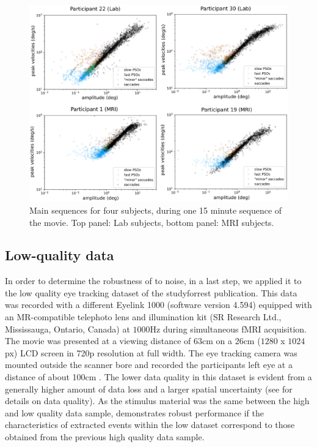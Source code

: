     \begin{figure}[h!]
        \includegraphics[width=1\textwidth]{img/main_sequences.eps}
        \caption{Main sequences for four subjects, during one 15 minute sequence of
        the movie. Top panel: Lab subjects, bottom panel: MRI subjects.}
        \label{fig:mains}
    \end{figure}

    \subsection*{Low-quality data}\label{ana_3}

    In order to determine the robustness of \remodnav to noise, in a last step, we applied it to the low quality eye
    tracking dataset of the studyforrest publication. This data was recorded with a different Eyelink 1000 (software
    version 4.594) equipped with an MR-compatible telephoto lens and illumination kit (SR Research Ltd., Mississauga,
    Ontario, Canada) at $1000$Hz during simultaneous fMRI acquisition. The movie was presented at a viewing distance
    of $63$cm on a 26cm ($1280$ x $1024$px) LCD screen in 720p resolution at full width. The eye tracking camera was
    mounted outside the scanner bore and recorded the participants left eye at a distance of about 100cm \citep{Hanke2016}.
    The lower data quality in this dataset is evident from a generally higher amount of data loss and a larger spatial
    uncertainty (see \citet{Hanke2016} for details on data quality). As the stimulus material was the same between
    the high and low quality data sample, \remodnav demonstrates robust performance if the characteristics of
    extracted events within the low dataset correspond to those obtained from the previous high quality data sample.

